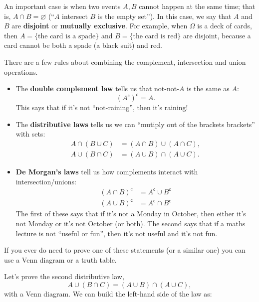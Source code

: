 \documentclass[
  a4paper,
]{book}
\providecommand{\tightlist}{%
  \setlength{\itemsep}{0pt}\setlength{\parskip}{0pt}}
\theoremstyle{definition}
\theoremstyle{definition}
\theoremstyle{definition}
\theoremstyle{definition}
\theoremstyle{remark}
\begin{document}
An important case is when two events \(A, B\) cannot happen at the same time; that is, \(A \cap B = \varnothing\) (``\(A\) intersect \(B\) is the empty set''). In this case, we say that \(A\) and \(B\) are \textbf{disjoint} or \textbf{mutually exclusive}. For example, when \(\Omega\) is a deck of cards, then \(A = \{\text{the card is a spade}\}\) and \(B = \{\text{the card is red}\}\) are disjoint, because a card cannot be both a spade (a black suit) and red.

There are a few rules about combining the complement, intersection and union operations.

\begin{itemize}
\tightlist
\item
  The \textbf{double complement law} tells us that not-not-\(A\) is the same as \(A\):
  \[ (A^\mathsf{c})^\mathsf{c}= A .\]
  This says that if it's not ``not-raining'', then it's raining!
\item
  The \textbf{distributive laws} tells us we can ``mutiply out of the brackets brackets'' with sets:
  \begin{align*}
  A \cap (B \cup C) &= (A \cap B) \cup (A \cap C) ,\\
  A \cup (B \cap C) &= (A \cup B) \cap (A \cup C) .
  \end{align*}
\item
  \textbf{De Morgan's laws} tell us how complements interact with intersection/unions:
  \begin{align*}
  (A \cap B)^\mathsf{c}&= A^\mathsf{c}\cup B^\mathsf{c}\\
  (A \cup B)^\mathsf{c}&= A^\mathsf{c}\cap B^\mathsf{c}
  \end{align*}
  The first of these says that if it's not a Monday in October, then either it's not Monday or it's not October (or both). The second says that if a maths lecture is not ``useful or fun'', then it's not useful and it's not fun.
\end{itemize}

If you ever do need to prove one of these statements (or a similar one) you can use a Venn diagram or a truth table.

Let's prove the second distributive law,
\[   A \cup (B \cap C) = (A \cup B) \cap (A \cup C) , \]
with a Venn diagram. We can build the left-hand side of the law as:
\end{document}
